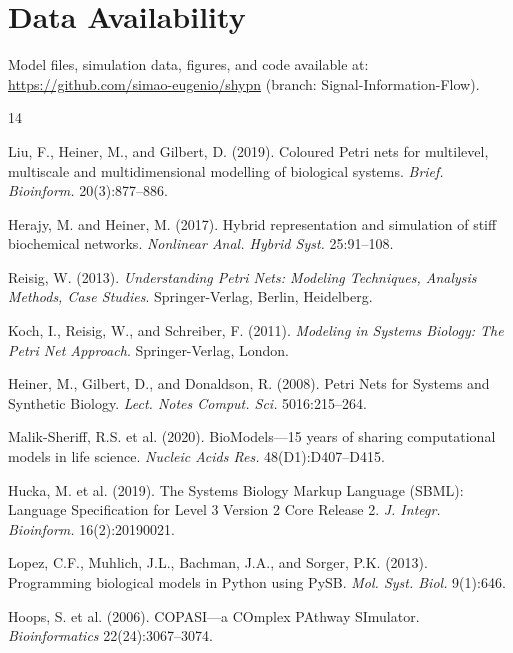 \documentclass[twocolumn,11pt]{article}
\begin{document}
\section*{Data Availability}

Model files, simulation data, figures, and code available at: \url{https://github.com/simao-eugenio/shypn} (branch: Signal-Information-Flow).


\begin{thebibliography}{14}
\setlength{\itemsep}{3pt}

Liu, F., Heiner, M., and Gilbert, D. (2019).
\newblock Coloured Petri nets for multilevel, multiscale and multidimensional modelling of biological systems.
\newblock \textit{Brief. Bioinform.} 20(3):877--886.

Herajy, M. and Heiner, M. (2017).
\newblock Hybrid representation and simulation of stiff biochemical networks.
\newblock \textit{Nonlinear Anal. Hybrid Syst.} 25:91--108.

Reisig, W. (2013).
\newblock \textit{Understanding Petri Nets: Modeling Techniques, Analysis Methods, Case Studies}.
\newblock Springer-Verlag, Berlin, Heidelberg.

Koch, I., Reisig, W., and Schreiber, F. (2011).
\newblock \textit{Modeling in Systems Biology: The Petri Net Approach}.
\newblock Springer-Verlag, London.

Heiner, M., Gilbert, D., and Donaldson, R. (2008).
\newblock Petri Nets for Systems and Synthetic Biology.
\newblock \textit{Lect. Notes Comput. Sci.} 5016:215--264.

Malik-Sheriff, R.S. et al. (2020).
\newblock BioModels---15 years of sharing computational models in life science.
\newblock \textit{Nucleic Acids Res.} 48(D1):D407--D415.

Hucka, M. et al. (2019).
\newblock The Systems Biology Markup Language (SBML): Language Specification for Level 3 Version 2 Core Release 2.
\newblock \textit{J. Integr. Bioinform.} 16(2):20190021.

Lopez, C.F., Muhlich, J.L., Bachman, J.A., and Sorger, P.K. (2013).
\newblock Programming biological models in Python using PySB.
\newblock \textit{Mol. Syst. Biol.} 9(1):646.

Hoops, S. et al. (2006).
\newblock COPASI---a COmplex PAthway SImulator.
\newblock \textit{Bioinformatics} 22(24):3067--3074.


\end{thebibliography}
\end{document}
